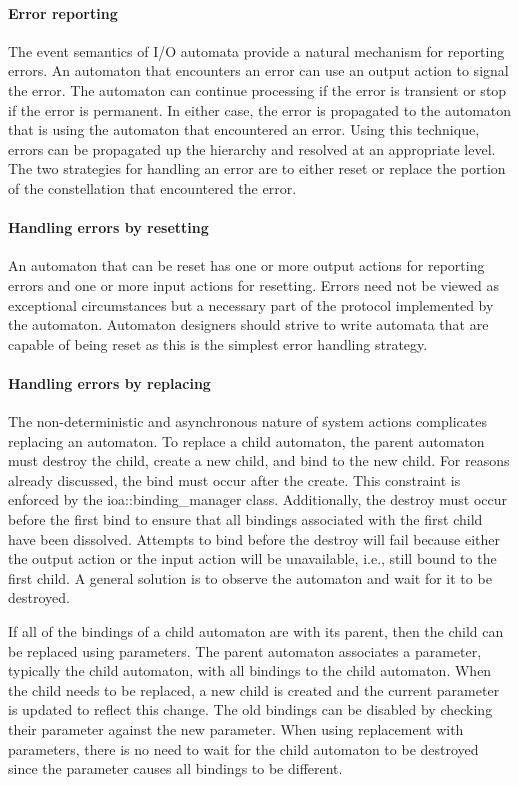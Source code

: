 \paragraph*{Error reporting}
The event semantics of I/O automata provide a natural mechanism for reporting errors.
An automaton that encounters an error can use an output action to signal the error.
The automaton can continue processing if the error is transient or stop if the error is permanent.
In either case, the error is propagated to the automaton that is using the automaton that encountered an error.
Using this technique, errors can be propagated up the hierarchy and resolved at an appropriate level.
The two strategies for handling an error are to either reset or replace the portion of the constellation that encountered the error.

\paragraph*{Handling errors by resetting}
An automaton that can be reset has one or more output actions for reporting errors and one or more input actions for resetting.
Errors need not be viewed as exceptional circumstances but a necessary part of the protocol implemented by the automaton.
Automaton designers should strive to write automata that are capable of being reset as this is the simplest error handling strategy.

\paragraph*{Handling errors by replacing}
The non-deterministic and asynchronous nature of system actions complicates replacing an automaton.
To replace a child automaton, the parent automaton must destroy the child, create a new child, and bind to the new child.
For reasons already discussed, the bind must occur after the create.
This constraint is enforced by the ioa::binding\_manager class.
Additionally, the destroy must occur before the first bind to ensure that all bindings associated with the first child have been dissolved.
Attempts to bind before the destroy will fail because either the output action or the input action will be unavailable, i.e., still bound to the first child.
A general solution is to observe the automaton and wait for it to be destroyed.

If all of the bindings of a child automaton are with its parent, then the child can be replaced using parameters.
The parent automaton associates a parameter, typically the child automaton, with all bindings to the child automaton.
When the child needs to be replaced, a new child is created and the current parameter is updated to reflect this change.
The old bindings can be disabled by checking their parameter against the new parameter.
When using replacement with parameters, there is no need to wait for the child automaton to be destroyed since the parameter causes all bindings to be different.
